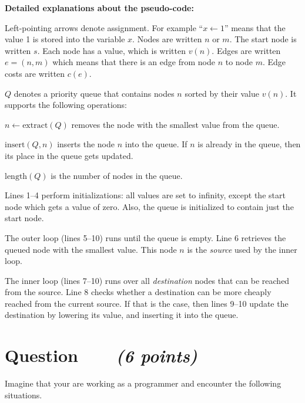\documentclass[a4paper]{article}
\newcounter{question}
\newcommand{\question}[1]{\refstepcounter{question}\section*{Question~\thequestion~~~\small\emph{(#1)}}}
\renewcommand*\thequestion{\arabic{question}}
\begin{document}
\vfill

\noindent\textbf{Detailed explanations about the pseudo-code:}

Left-pointing arrows denote assignment.
For example ``$x \leftarrow 1$'' means that the value 1 is stored into the variable $x$.
Nodes are written $n$ or $m$.
The start node is written $s$.
Each node has a value, which is written $v(n)$.
Edges are written $e=(n,m)$ which means that there is an edge from node $n$ to node $m$.
Edge costs are written $c(e)$.

$Q$ denotes a priority queue that contains nodes $n$ sorted by their value $v(n)$.
It supports the following operations:
\begin{compactitem}
\item
  $n \leftarrow \text{extract}(Q)$ removes the node with the smallest value from the queue.
\item
  $\text{insert}(Q,n)$ inserts the node $n$ into the queue.
  If $n$ is already in the queue, then its place in the queue gets updated.
\item
  $\text{length}(Q)$ is the number of nodes in the queue.
\end{compactitem}

Lines 1--4 perform initializations: all values are set to infinity, except the start node which gets a value of zero.
Also, the queue is initialized to contain just the start node.

The outer loop (lines 5--10) runs until the queue is empty.
Line 6 retrieves the queued node with the smallest value.
This node $n$ is the \emph{source} used by the inner loop.

The inner loop (lines 7--10) runs over all \emph{destination} nodes that can be reached from the source.
Line 8 checks whether a destination can be more cheaply reached from the current source.
If that is the case, then lines 9--10 update the destination by lowering its value, and inserting it into the queue.



\clearpage

\question{6 points}

Imagine that your are working as a programmer and encounter the following situations.
\end{document}
